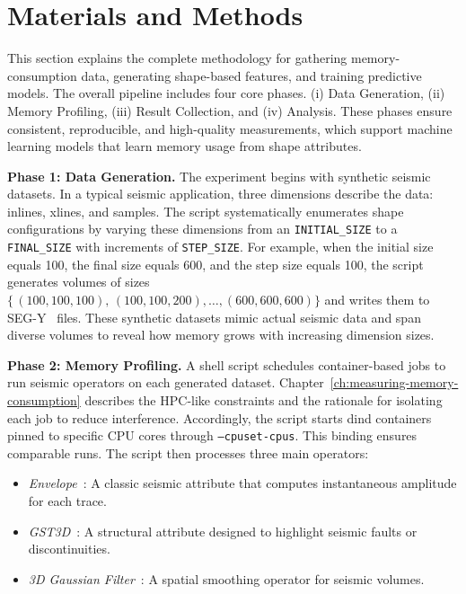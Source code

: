 \section{Materials and Methods}
\label{sec:pmc-materials-and-methods}

This section explains the complete methodology for gathering memory-consumption data, generating shape-based features, and training predictive models.
The overall pipeline includes four core phases.
(i) Data Generation,
(ii) Memory Profiling,
(iii) Result Collection,
and (iv) Analysis.
These phases ensure consistent, reproducible, and high-quality measurements, which support machine learning models that learn memory usage from shape attributes.

\vspace{1em}
\noindent
\textbf{Phase 1: Data Generation.}
The experiment begins with synthetic seismic datasets.
In a typical seismic application, three dimensions describe the data: inlines, xlines, and samples.
The script systematically enumerates shape configurations by varying these dimensions from an \texttt{INITIAL\_SIZE} to a \texttt{FINAL\_SIZE} with increments of \texttt{STEP\_SIZE}.
For example, when the initial size equals 100, the final size equals 600, and the step size equals 100, the script generates volumes of sizes
\(\{\,(100,100,100),\,(100,100,200),\dots,(600,600,600)\}\)
and writes them to \ac{SEG-Y}~\cite{barry1975segy} files.
These synthetic datasets mimic actual seismic data and span diverse volumes to reveal how memory grows with increasing dimension sizes.

\vspace{1em}
\noindent
\textbf{Phase 2: Memory Profiling.}
A shell script schedules container-based jobs to run seismic operators on each generated dataset.
Chapter~\ref{ch:measuring-memory-consumption} describes the \ac{HPC}-like constraints and the rationale for isolating each job to reduce interference.
Accordingly, the script starts \ac{dind} containers pinned to specific \ac{CPU} cores through \texttt{--cpuset-cpus}.
This binding ensures comparable runs.
The script then processes three main operators:

\begin{itemize}
    \item \emph{Envelope}~\cite{taner1979complex}: A classic seismic attribute that computes instantaneous amplitude for each trace.
    \item \emph{\ac{GST3D}}~\cite{bigun2004recognition}: A structural attribute designed to highlight seismic faults or discontinuities.
    \item \emph{3D Gaussian Filter}~\cite{gonzalez2002digital}: A spatial smoothing operator for seismic volumes.
\end{itemize}

